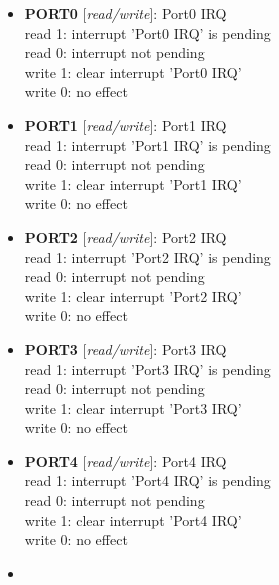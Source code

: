 \begin{itemize}
\item \begin{small}
{\bf 
PORT0
} [\emph{read/write}]: Port0 IRQ
\\
read 1: interrupt 'Port0 IRQ' is pending\\read 0: interrupt not pending\\write 1: clear interrupt 'Port0 IRQ'\\write 0: no effect
\end{small}
\item \begin{small}
{\bf 
PORT1
} [\emph{read/write}]: Port1 IRQ
\\
read 1: interrupt 'Port1 IRQ' is pending\\read 0: interrupt not pending\\write 1: clear interrupt 'Port1 IRQ'\\write 0: no effect
\end{small}
\item \begin{small}
{\bf 
PORT2
} [\emph{read/write}]: Port2 IRQ
\\
read 1: interrupt 'Port2 IRQ' is pending\\read 0: interrupt not pending\\write 1: clear interrupt 'Port2 IRQ'\\write 0: no effect
\end{small}
\item \begin{small}
{\bf 
PORT3
} [\emph{read/write}]: Port3 IRQ
\\
read 1: interrupt 'Port3 IRQ' is pending\\read 0: interrupt not pending\\write 1: clear interrupt 'Port3 IRQ'\\write 0: no effect
\end{small}
\item \begin{small}
{\bf 
PORT4
} [\emph{read/write}]: Port4 IRQ
\\
read 1: interrupt 'Port4 IRQ' is pending\\read 0: interrupt not pending\\write 1: clear interrupt 'Port4 IRQ'\\write 0: no effect
\end{small}
\item \begin{small}

\end{small}
\end{itemize}
